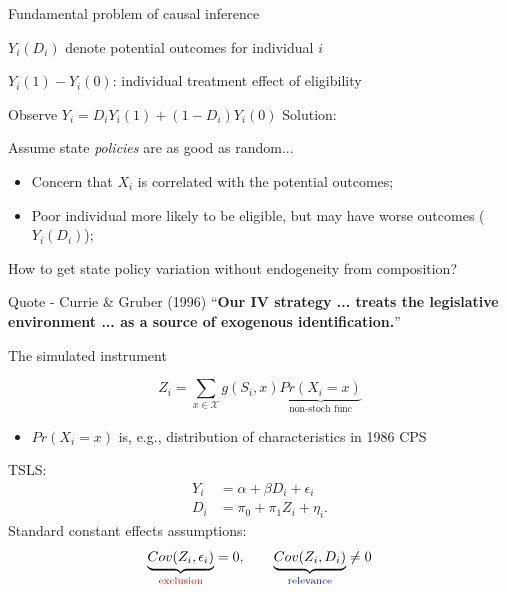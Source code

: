 \documentclass[notes,11pt, aspectratio=169]{beamer}
\newenvironment{wideitemize}{\itemize\addtolength{\itemsep}{10pt}}{\enditemize}
\begin{document}
\begin{frame}{Fundamental problem of causal inference}
  \begin{wideitemize}
  \item $Y_{i}(D_{i})$ denote potential outcomes for individual $i$ 
  \item $Y_{i}(1) - Y_{i}(0)$: individual treatment effect of eligibility
  \item Observe $Y_{i} = D_{i}Y_{i}(1) + (1-D_{i})Y_{i}(0)$ 
  \end{wideitemize}
  Solution:
  \begin{wideitemize}
  \item Assume state \textit{policies} are as good as
    random...
    \begin{itemize} 
    \item Concern that $X_{i}$ is correlated with the
      potential outcomes;
    \item Poor individual more likely to be eligible, but may have worse outcomes ($Y_{i}(D_{i})$);
    \end{itemize}
  \item How to get state policy variation without endogeneity from composition? 
  \end{wideitemize}
\end{frame}

\begin{frame}{Quote - Currie \& Gruber (1996)}
  ``\textbf{Our IV strategy
  ... treats the legislative environment ... as a source of exogenous identification.}''
\end{frame}


\begin{frame}{  The simulated instrument}
 
    \begin{equation*}
      Z_{i} = \sum_{x \in \mathcal{X}}g(S_{i}, x) \underbrace{Pr(X_{i} = x)}_{\text{non-stoch func}}      
    \end{equation*}
    \begin{itemize}
    \item $Pr(X_i=x)$ is, e.g., distribution of characteristics in 1986 CPS
    \end{itemize} 
   TSLS:
    \begin{align*}
      Y_{i} &= \alpha + \beta D_{i} + \epsilon_{i} \\
      D_{i} &= \pi_0 + \pi_{1} Z_{i} + \eta_{i}.
    \end{align*}
    Standard constant effects assumptions:
    \begin{equation*}
      \underbrace{Cov(Z_{i},\epsilon_{i})}_{\text{\textcolor{red}{exclusion}}} = 0, \qquad       \underbrace{Cov(Z_{i},D_{i})}_{\text{\textcolor{blue}{relevance}}} \not= 0
    \end{equation*}
\end{frame}
\end{document}
